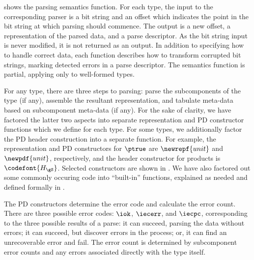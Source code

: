  shows the parsing semantics function.  For each
type, the input to the corresponding parser is a bit string and an
offset which indicates the point in the bit string at which parsing
should commence.  The output is a new offset, a representation of the
parsed data, and a parse descriptor. As the bit string input is
never modified, it is not returned as an output.  In addition
to specifying how to handle correct data, each function describes how
to transform corrupted bit strings, marking detected errors in
a parse descriptor. The semantics function is partial, applying only
to well-formed \ddc{} types.

For any type, there are three steps to parsing: parse the
subcomponents of the type (if any), assemble the resultant representation, and
tabulate meta-data based on subcomponent meta-data
(if any). For the sake of clarity, we have factored the latter two
aspects into separate representation and PD constructor functions which we define for
each type. For some types, we additionally factor the PD header
construction into a separate function. For example, the representation 
and PD constructors for $\ptrue$ are $\newrepf {unit}$ and $\newpdf
{unit}$, respectively, and the header constructor for products is
${\codefont{H_{\gS}}}$. Selected constructors are shown in
. We have also factored out some commonly
occuring code into ``built-in'' functions, explained as needed and
defined formally in .

The PD constructors determine the error code and
calculate the error count.  There are three possible error codes:
$\iok$, $\iecerr$, and $\iecpc$, corresponding to the three possible results of a parse: 
it can succeed, parsing the data without errors; it can succeed,
but discover errors in the process; or, it can find an
unrecoverable error and fail.
The error count is determined by subcomponent error counts and any errors associated directly with the type
itself.  

